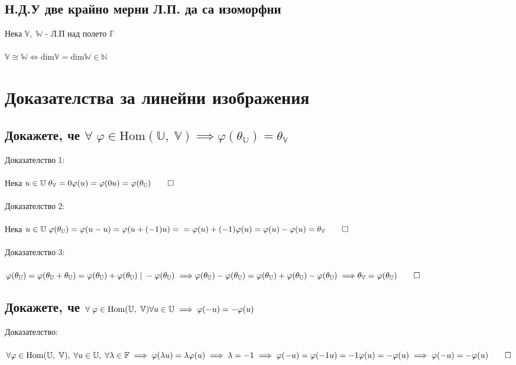 \documentclass{article}
\newcommand{\V}{\mathbb{V}}
\newcommand{\N}{\mathbb{N}}
\newcommand{\F}{\mathbb{F}}
\newcommand{\W}{\mathbb{W}}
\newcommand{\UV}{\mathbb{U}}
\newcommand{\OV}{\theta}
\begin{document}
    \subsection{Н.Д.У две крайно мерни Л.П. да са изоморфни}
    Нека \(\V, \; \W\) - Л.П над полето \(\F\) \\\\
    \(\V \cong \W \iff \mathrm{dim}\V = \mathrm{dim}\W \in \N\)
    \section{Доказателства за линейни изображения}
    \subsection{Докажете, че \(\forall \; \varphi \in \mathrm{Hom}(\UV, \; \V) \implies \varphi(\OV_\UV) = \OV_\V\)}
    Доказателство 1: \\\\
    Нека \(u \in \UV \; \OV_\V = 0\varphi(u) = \varphi(0u) = \varphi(\OV_\UV) \qed \) \\\\
    Доказателство 2: \\\\
    Нека \(u \in \UV \; \varphi(\OV_\UV) = \varphi(u - u) = \varphi(u + (-1)u) = \\\\
    = \varphi(u) + (-1)\varphi(u) = \varphi(u) - \varphi(u) = \OV_\V \qed \) \\\\
    Доказателство 3: \\\\
    \(\varphi(\OV_\UV) = \varphi(\OV_\UV + \OV_\UV) = \varphi(\OV_\UV) + \varphi(\OV_\UV) \; | \; -\varphi(\OV_\UV) \implies \\\\
    \varphi(\OV_\UV) - \varphi(\OV_\UV) = \varphi(\OV_\UV) + \varphi(\OV_\UV) - \varphi(\OV_\UV) \implies \\\\
    \OV_\V = \varphi(\OV_\UV) \qed \)
    \subsection{Докажете, че \(\forall \; \varphi \in \mathrm{Hom}(\UV, \; \V) \\
    \forall u \in \UV \implies \varphi(-u) = -\varphi(u)\)}
    Доказателство: \\\\
    \(\forall \varphi \in \mathrm{Hom}(\UV, \; \V), \; \forall u \in \UV, \; \forall \lambda \in \F \implies \varphi(\lambda u) = \lambda \varphi(u) \\\\
    \implies \lambda = -1 \implies \varphi(-u) = \varphi(-1u) = -1\varphi(u) = -\varphi(u) \\\\
    \implies \varphi(-u) = -\varphi(u) \qed\)
\end{document}
